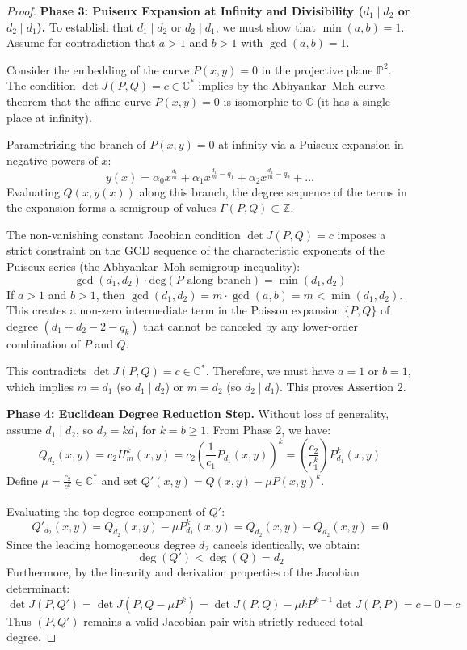 \documentclass[11pt,reqno]{amsart}
\theoremstyle{definition}
\begin{document}
\begin{proof}
\textbf{Phase 3: Puiseux Expansion at Infinity and Divisibility ($d_1 \mid d_2$ or $d_2 \mid d_1$).}
To establish that $d_1 \mid d_2$ or $d_2 \mid d_1$, we must show that $\min(a, b) = 1$. Assume for contradiction that $a > 1$ and $b > 1$ with $\gcd(a, b) = 1$.

Consider the embedding of the curve $P(x,y) = 0$ in the projective plane $\mathbb{P}^2$. The condition $\det J(P,Q) = c \in \mathbb{C}^*$ implies by the Abhyankar--Moh curve theorem that the affine curve $P(x,y) = 0$ is isomorphic to $\mathbb{C}$ (it has a single place at infinity).

Parametrizing the branch of $P(x,y) = 0$ at infinity via a Puiseux expansion in negative powers of $x$:
$$y(x) = \alpha_0 x^{\frac{d_1}{m}} + \alpha_1 x^{\frac{d_1}{m} - q_1} + \alpha_2 x^{\frac{d_1}{m} - q_2} + \dots$$
Evaluating $Q(x, y(x))$ along this branch, the degree sequence of the terms in the expansion forms a semigroup of values $\Gamma(P, Q) \subset \mathbb{Z}$.

The non-vanishing constant Jacobian condition $\det J(P,Q) = c$ imposes a strict constraint on the GCD sequence of the characteristic exponents of the Puiseux series (the Abhyankar--Moh semigroup inequality):
$$\gcd(d_1, d_2) \cdot \text{deg}(P \text{ along branch}) = \min(d_1, d_2)$$
If $a > 1$ and $b > 1$, then $\gcd(d_1, d_2) = m \cdot \gcd(a, b) = m < \min(d_1, d_2)$. This creates a non-zero intermediate term in the Poisson expansion $\{P, Q\}$ of degree $(d_1 + d_2 - 2 - q_k)$ that cannot be canceled by any lower-order combination of $P$ and $Q$. 

This contradicts $\det J(P,Q) = c \in \mathbb{C}^*$. Therefore, we must have $a = 1$ or $b = 1$, which implies $m = d_1$ (so $d_1 \mid d_2$) or $m = d_2$ (so $d_2 \mid d_1$). This proves Assertion 2.

\textbf{Phase 4: Euclidean Degree Reduction Step.}
Without loss of generality, assume $d_1 \mid d_2$, so $d_2 = k d_1$ for $k = b \ge 1$. From Phase 2, we have:
$$Q_{d_2}(x,y) = c_2 H_m^k(x,y) = c_2 \left( \frac{1}{c_1} P_{d_1}(x,y) \right)^k = \left( \frac{c_2}{c_1^k} \right) P_{d_1}^k(x,y)$$
Define $\mu = \frac{c_2}{c_1^k} \in \mathbb{C}^*$ and set $Q'(x,y) = Q(x,y) - \mu P(x,y)^k$. 

Evaluating the top-degree component of $Q'$:
$$Q'_{d_2}(x,y) = Q_{d_2}(x,y) - \mu P_{d_1}^k(x,y) = Q_{d_2}(x,y) - Q_{d_2}(x,y) = 0$$
Since the leading homogeneous degree $d_2$ cancels identically, we obtain:
$$\deg(Q') < \deg(Q) = d_2$$
Furthermore, by the linearity and derivation properties of the Jacobian determinant:
$$\det J(P, Q') = \det J(P, Q - \mu P^k) = \det J(P, Q) - \mu k P^{k-1} \det J(P, P) = c - 0 = c$$
Thus $(P, Q')$ remains a valid Jacobian pair with strictly reduced total degree.
\end{proof}
\end{document}
